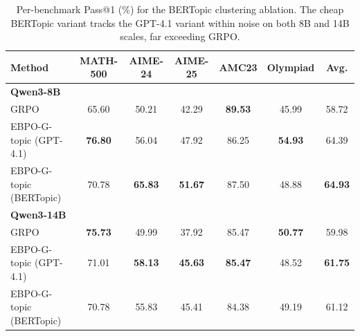 \documentclass{article}
\theoremstyle{plain}
\theoremstyle{definition}
\theoremstyle{remark}
\newcommand{\oursG}{\textsc{EBPO-G}\xspace}
\begin{document}
\begin{table}[t]
\centering
\small
\begin{tabular}{lcccccc}
\toprule
\textbf{Method} & \textbf{MATH-500} & \textbf{AIME-24} & \textbf{AIME-25} & \textbf{AMC23} & \textbf{Olympiad} & \textbf{Avg.} \\
\midrule
\multicolumn{7}{l}{\textbf{Qwen3-8B}} \\
\midrule
GRPO                          & 65.60          & 50.21          & 42.29          & \textbf{89.53} & 45.99          & 58.72 \\
\oursG-topic (GPT-4.1)        & \textbf{76.80} & 56.04          & 47.92          & 86.25          & \textbf{54.93} & 64.39 \\
\oursG-topic (BERTopic)       & 70.78          & \textbf{65.83} & \textbf{51.67} & 87.50          & 48.88          & \textbf{64.93} \\
\midrule
\multicolumn{7}{l}{\textbf{Qwen3-14B}} \\
\midrule
GRPO                          & \textbf{75.73} & 49.99          & 37.92          & 85.47          & \textbf{50.77} & 59.98 \\
\oursG-topic (GPT-4.1)        & 71.01          & \textbf{58.13} & \textbf{45.63} & \textbf{85.47} & 48.52          & \textbf{61.75} \\
\oursG-topic (BERTopic)       & 70.78          & 55.83          & 45.41          & 84.38          & 49.19          & 61.12 \\
\bottomrule
\end{tabular}
\caption{Per-benchmark Pass@1 (\%) for the BERTopic clustering ablation. The cheap BERTopic variant tracks the GPT-4.1 variant within noise on both 8B and 14B scales, far exceeding GRPO.}
\label{tab:bertopic_full}
\end{table}


\end{document}
